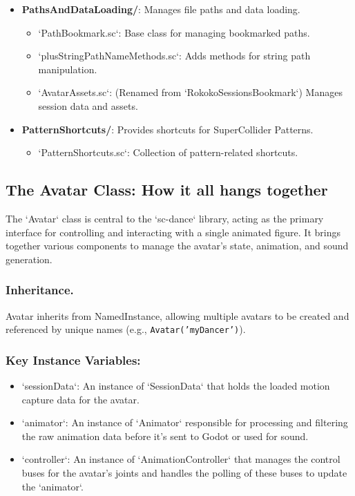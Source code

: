 \documentclass[11pt]{article}
\begin{document}
\begin{itemize}
\item \textbf{PathsAndDataLoading/}: Manages file paths and data loading.
\begin{itemize}
\item `PathBookmark.sc`: Base class for managing bookmarked paths.
\item `plusStringPathNameMethods.sc`: Adds methods for string path manipulation.
\item `AvatarAssets.sc`: (Renamed from `RokokoSessionsBookmark`) Manages session data and assets.
\end{itemize}

\item \textbf{PatternShortcuts/}: Provides shortcuts for SuperCollider Patterns.
\begin{itemize}
\item `PatternShortcuts.sc`: Collection of pattern-related shortcuts.
\end{itemize}
\end{itemize}
\subsection{The Avatar Class: How it all hangs together}
\label{sec:org7c84ea3}

The `Avatar` class is central to the `sc-dance` library, acting as the primary interface for controlling and interacting with a single animated figure. It brings together various components to manage the avatar's state, animation, and sound generation.
\subsubsection{Inheritance.}
\label{sec:org8889fd5}

Avatar inherits from NamedInstance, allowing multiple avatars to be created and referenced by unique names (e.g., \texttt{Avatar('myDancer')}).
\subsubsection{\textbf{Key Instance Variables}:}
\label{sec:org2fed298}
\begin{itemize}
\item `sessionData`: An instance of `SessionData` that holds the loaded motion capture data for the avatar.
\item `animator`: An instance of `Animator` responsible for processing and filtering the raw animation data before it's sent to Godot or used for sound.
\item `controller`: An instance of `AnimationController` that manages the control buses for the avatar's joints and handles the polling of these buses to update the `animator`.
\end{itemize}
\end{document}
